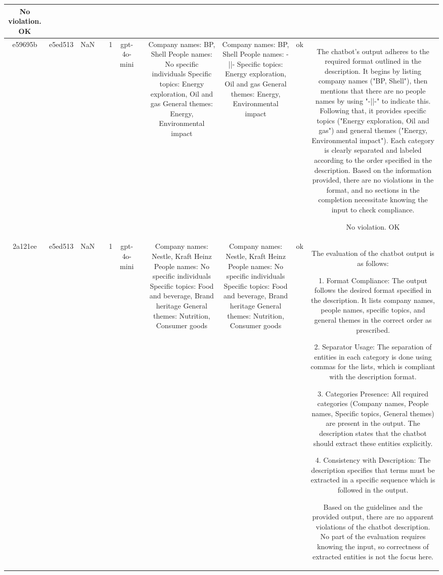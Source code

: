 \begin{table}[h!]
\begin{tabular}{|c|c|c|c|c|c|c|c|c|c|c|}
No violation.
OK\\
\hline
e59695b & e5ed513 & NaN &  & 1 & gpt-4o-mini &  & Company names: BP, Shell
People names: No specific individuals
Specific topics: Energy exploration, Oil and gas
General themes: Energy, Environmental impact & Company names: BP, Shell  
People names: -||-  
Specific topics: Energy exploration, Oil and gas  
General themes: Energy, Environmental impact   & ok & The chatbot's output adheres to the required format outlined in the description. It begins by listing company names ("BP, Shell"), then mentions that there are no people names by using "-||-" to indicate this. Following that, it provides specific topics ("Energy exploration, Oil and gas") and general themes ("Energy, Environmental impact"). Each category is clearly separated and labeled according to the order specified in the description. Based on the information provided, there are no violations in the format, and no sections in the completion necessitate knowing the input to check compliance.

No violation.
OK\\
\hline
2a121ee & e5ed513 & NaN &  & 1 & gpt-4o-mini &  & Company names: Nestle, Kraft Heinz
People names: No specific individuals
Specific topics: Food and beverage, Brand heritage
General themes: Nutrition, Consumer goods & Company names: Nestle, Kraft Heinz  
People names: No specific individuals  
Specific topics: Food and beverage, Brand heritage  
General themes: Nutrition, Consumer goods   & ok & The evaluation of the chatbot output is as follows:

1. Format Compliance: The output follows the desired format specified in the description. It lists company names, people names, specific topics, and general themes in the correct order as prescribed.

2. Separator Usage: The separation of entities in each category is done using commas for the lists, which is compliant with the description format.

3. Categories Presence: All required categories (Company names, People names, Specific topics, General themes) are present in the output. The description states that the chatbot should extract these entities explicitly.

4. Consistency with Description: The description specifies that terms must be extracted in a specific sequence which is followed in the output.

Based on the guidelines and the provided output, there are no apparent violations of the chatbot description. No part of the evaluation requires knowing the input, so correctness of extracted entities is not the focus here.


\end{tabular}
\end{table}

